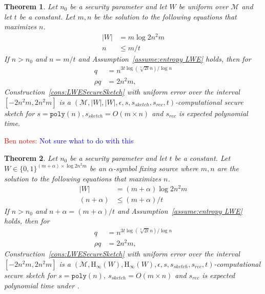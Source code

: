 \documentclass[11pt]{article}
\newcommand{\assref}[1]{\mbox{Assumption~\ref{#1}}}
\newcommand{\poly}{\ensuremath{\mathtt{poly}}\xspace}
\newcommand{\Hoo}{\mathrm{H}_\infty}
\newtheorem{theorem}{Theorem}[section]
\newcommand{\authnote}[2]{{\textcolor{red}{\textsf{#1 notes: }\textcolor{blue}{ #2}}\marginpar{\textcolor{red}{\textbf{!!!!!}}}}}
\newcommand{\authnote}[2]{}
\newcommand{\bnote}[1]{{\authnote{Ben}{#1}}}
\begin{document}
{\begin{theorem}
\label{thm:security of secure sketch}
Let $n_0$ be a security parameter and let $W$ be uniform over $\mathcal{M}$ and let $t$ be a constant.  Let $m,n $ be the solution to the following equations that maximizes $n$.
\begin{align*}
|W| &= m\log 2n^2m\\
n&\leq m/t
\end{align*}
If $n>n_0$ and $n = m/t$ and \assref{assume:entropy LWE} holds, then for 
\begin{align*}
q &= n^{3t\log( \sqrt[3]{2t}n)/\log n}\\
\rho q &= 2n^2m,
\end{align*}  Construction~\ref{cons:LWESecureSketch} with uniform error over the interval $[-2n^2m, 2n^2m]$ is a $(\mathcal{M}, |W|, |W|, \epsilon, s, s_{sketch}, s_{rec}, t)$-computational secure sketch for $s = \poly(n), s_{sketch} = O(m\times n )$ and $s_{rec}$ is expected polynomial time.
\end{theorem}

\bnote{Not sure what to do with this}
\begin{theorem}
\label{thm:security of block sketch}
Let $n_0$ be a security parameter and let $t$ be a constant.  Let $W\in \{0, 1\}^{(m+\alpha)\times \log 2n^2m}$ be an $\alpha$-symbol fixing source where $m,n $ are the solution to the following equations that maximizes $n$.
\begin{align*}
|W| &= (m+\alpha)\log 2n^2m\\
(n+\alpha)&\leq (m+\alpha)/t
\end{align*}
If $n>n_0$ and $n+\alpha = (m+\alpha)/t$ and \assref{assume:entropy LWE} holds, then for 
\begin{align*}
q &= n^{3t\log( \sqrt[3]{2t}n)/\log n}\\
\rho q &= 2n^2m,
\end{align*}  Construction~\ref{cons:LWESecureSketch} with uniform error over the interval $[-2n^2m, 2n^2m]$ is a $(\mathcal{M}, \Hoo(W), \Hoo(W), \epsilon, s, s_{sketch}, s_{rec}, t)$-computational secure sketch for $s= \poly(n)$,  $s_{sketch} = O(m\times n )$ and $s_{rec}$ is expected polynomial time under .
\end{theorem}

}
\end{document}
